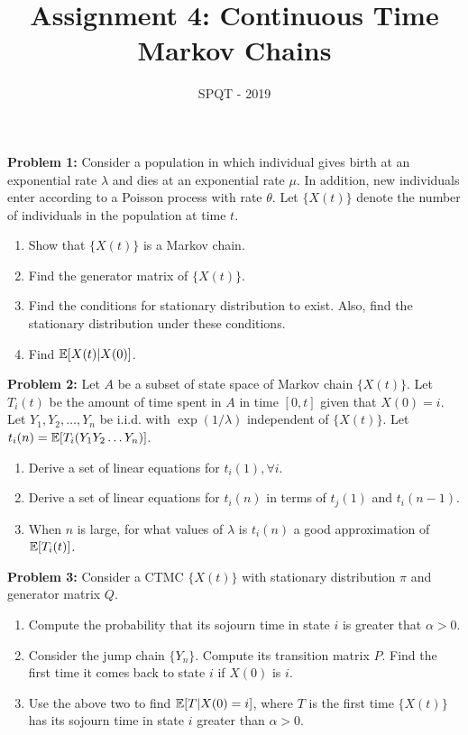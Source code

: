 \documentclass[a4paper,11pt,english]{article}
\title{Assignment 4: Continuous Time Markov Chains}
\author{SPQT - 2019}
\begin{document}
\maketitle
\textbf{Problem 1:} Consider a population in which individual gives birth at an exponential rate $\lambda$ and dies at an exponential rate $\mu$. In addition, new individuals enter according to a Poisson process with rate $\theta$. Let $\{X(t)\}$ denote the number of individuals in the population at time $t$. 
\begin{enumerate}
\item Show that $\{X(t)\}$ is a Markov chain. 
\item Find the generator matrix of $\{X(t)\}$. 
\item Find the conditions for stationary distribution to exist. Also, find the stationary distribution under these conditions. 
\item Find $\mathbb{E}[X(t)|X(0)]$.
\end{enumerate}

\indent \textbf{Problem 2:} Let $A$ be a subset of state space of Markov chain $\{X(t)\}$. Let $T_i(t)$ be the amount of time spent in $A$ in time $[0,t]$ given that $X(0)=i$. Let $Y_1,Y_2,\dots,Y_n$ be i.i.d. with $\exp(1/\lambda)$ independent of $\{X(t)\}$. Let $t_i(n) = \mathbb{E}[T_i(Y_1 Y_2 \dots Y_n)]$.
\begin{enumerate}
\item Derive a set of linear equations for $t_i(1), \forall i$.
\item Derive a set of linear equations for $t_i(n)$ in terms of $t_j(1)$ and $t_i(n-1)$.
\item When $n$ is large, for what values of $\lambda$ is $t_i(n)$ a good approximation of $\mathbb{E}[T_i(t)]$.
\end{enumerate}

\indent \textbf{Problem 3:} Consider a CTMC $\{X(t)\}$ with stationary distribution $\pi$ and generator matrix $Q$.
\begin{enumerate}
\item Compute the probability that its sojourn time in state $i$ is greater that $\alpha>0$.
\item Consider the jump chain $\{Y_n\}$. Compute its transition matrix $P$. Find the first time it comes back to state $i$ if $X(0)$ is $i$.
\item Use the above two to find $\mathbb{E}[T|X(0)=i]$, where $T$ is the first time $\{X(t)\}$ has its sojourn time in state $i$ greater than $\alpha>0$.
\end{enumerate}
\end{document}
